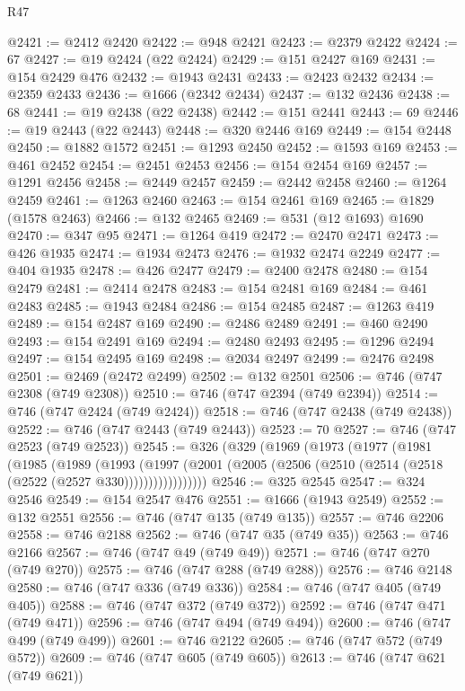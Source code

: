 \begin{lexlean}{R47}
\begin{coremodule}
@2421 := @2412 @2420
@2422 := @948 @2421
@2423 := @2379 @2422
@2424 := 67
@2427 := @19 @2424 (@22 @2424)
@2429 := @151 @2427 @169
@2431 := @154 @2429 @476
@2432 := @1943 @2431
@2433 := @2423 @2432
@2434 := @2359 @2433
@2436 := @1666 (@2342 @2434)
@2437 := @132 @2436
@2438 := 68
@2441 := @19 @2438 (@22 @2438)
@2442 := @151 @2441
@2443 := 69
@2446 := @19 @2443 (@22 @2443)
@2448 := @320 @2446 @169
@2449 := @154 @2448
@2450 := @1882 @1572
@2451 := @1293 @2450
@2452 := @1593 @169
@2453 := @461 @2452
@2454 := @2451 @2453
@2456 := @154 @2454 @169
@2457 := @1291 @2456
@2458 := @2449 @2457
@2459 := @2442 @2458
@2460 := @1264 @2459
@2461 := @1263 @2460
@2463 := @154 @2461 @169
@2465 := @1829 (@1578 @2463)
@2466 := @132 @2465
@2469 := @531 (@12 @1693) @1690
@2470 := @347 @95
@2471 := @1264 @419
@2472 := @2470 @2471
@2473 := @426 @1935
@2474 := @1934 @2473
@2476 := @1932 @2474 @2249
@2477 := @404 @1935
@2478 := @426 @2477
@2479 := @2400 @2478
@2480 := @154 @2479
@2481 := @2414 @2478
@2483 := @154 @2481 @169
@2484 := @461 @2483
@2485 := @1943 @2484
@2486 := @154 @2485
@2487 := @1263 @419
@2489 := @154 @2487 @169
@2490 := @2486 @2489
@2491 := @460 @2490
@2493 := @154 @2491 @169
@2494 := @2480 @2493
@2495 := @1296 @2494
@2497 := @154 @2495 @169
@2498 := @2034 @2497
@2499 := @2476 @2498
@2501 := @2469 (@2472 @2499)
@2502 := @132 @2501
@2506 := @746 (@747 @2308 (@749 @2308))
@2510 := @746 (@747 @2394 (@749 @2394))
@2514 := @746 (@747 @2424 (@749 @2424))
@2518 := @746 (@747 @2438 (@749 @2438))
@2522 := @746 (@747 @2443 (@749 @2443))
@2523 := 70
@2527 := @746 (@747 @2523 (@749 @2523))
@2545 := @326
    (@329
      (@1969
        (@1973
          (@1977
            (@1981
              (@1985
                (@1989
                  (@1993
                    (@1997
                      (@2001 (@2005 (@2506 (@2510 (@2514 (@2518 (@2522 (@2527 @330)))))))))))))))))
@2546 := @325 @2545
@2547 := @324 @2546
@2549 := @154 @2547 @476
@2551 := @1666 (@1943 @2549)
@2552 := @132 @2551
@2556 := @746 (@747 @135 (@749 @135))
@2557 := @746 @2206
@2558 := @746 @2188
@2562 := @746 (@747 @35 (@749 @35))
@2563 := @746 @2166
@2567 := @746 (@747 @49 (@749 @49))
@2571 := @746 (@747 @270 (@749 @270))
@2575 := @746 (@747 @288 (@749 @288))
@2576 := @746 @2148
@2580 := @746 (@747 @336 (@749 @336))
@2584 := @746 (@747 @405 (@749 @405))
@2588 := @746 (@747 @372 (@749 @372))
@2592 := @746 (@747 @471 (@749 @471))
@2596 := @746 (@747 @494 (@749 @494))
@2600 := @746 (@747 @499 (@749 @499))
@2601 := @746 @2122
@2605 := @746 (@747 @572 (@749 @572))
@2609 := @746 (@747 @605 (@749 @605))
@2613 := @746 (@747 @621 (@749 @621))

\end{coremodule}
\end{lexlean}
